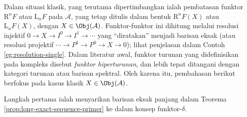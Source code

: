 Dalam situasi klasik, yang terutama dipertimbangkan ialah pembatasan funktor $\mathrm{R}^n F$ atau $\mathrm{L}_n F$ pada $\mathcal{A}$, yang tetap ditulis dalam bentuk $\mathrm{R}^n F(X)$ atau $\mathrm{L}_n F(X)$, dengan $X \in \Obj(\mathcal{A})$. Funktor-funktor ini dihitung melalui resolusi injektif $0 \to X \to I^0 \to I^1 \to \cdots$ yang ``diratakan'' menjadi barisan eksak (atau resolusi projektif $\cdots \to P^1 \to P^0 \to X \to 0$); lihat penjelasan dalam Contoh \ref{eg:resolution-single}. Dalam literatur awal, funktor turunan yang didefinisikan pada kompleks disebut \emph{funktor hiperturunan}, dan lebih tepat ditangani dengan kategori turunan atau barisan spektral. Oleh karena itu, pembahasan berikut berfokus pada kasus klasik $X \in \Obj(\mathcal{A})$.

Langkah pertama ialah menyarikan barisan eksak panjang dalam Teorema \ref{prop:long-exact-sequence-primer} ke dalam konsep funktor-$\delta$.


